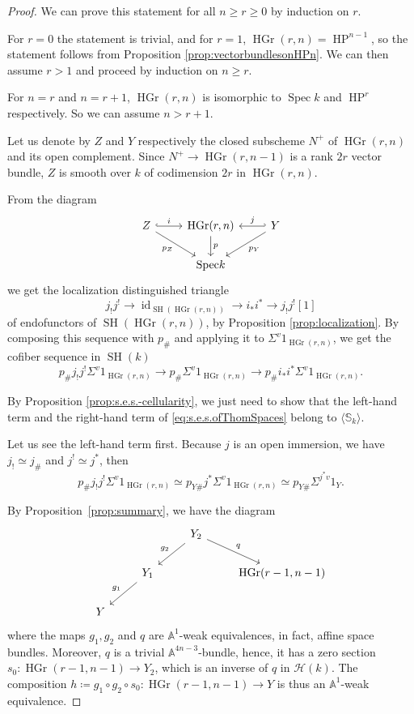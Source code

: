 \documentclass[10pt]{amsart}
\theoremstyle{definition}
\theoremstyle{plain}
\numberwithin{equation}{section}
\newcommand{\0}{\emptyset}
\newcommand{\sH}{{\mathcal H}}
\newcommand{\HGr}{{\operatorname{HGr}}}
\newcommand{\HP}{{\operatorname{HP}}}
\newcommand{\Spec}{{\operatorname{Spec}}}
\newcommand{\SH}{{\operatorname{SH}}}
\newcommand{\id}{{\operatorname{id}}}
\begin{document}
\begin{proof}
 We can prove this statement for all $n \ge r \ge 0$ by induction on $r$.

For $r=0$ the statement is trivial, and for $r=1$, $\HGr(r,n)=\HP^{n-1}$, so the statement follows from Proposition \ref{prop:vectorbundlesonHPn}. We can then assume $r>1$ and proceed by induction on $n \ge r$.

For $n=r$ and $n=r+1$, $\HGr(r,n)$ is isomorphic to $\Spec k$ and $\HP^r$ respectively. So we can assume $n>r+1$.

Let us denote by $Z$ and $Y$ respectively the closed subscheme $N^+$ of $\HGr(r,n)$ and its open complement. Since $N^+\to \HGr(r,n-1)$ is a rank $2r$ vector bundle, $Z$ is smooth over $k$ of codimension $2r$ in $\HGr(r,n)$.

From the diagram
\begin{equation}
\label{diag:loc.sequence.HGr}
    \begin{tikzcd}
    Z \arrow[r, hookrightarrow, "i"] \arrow[dr, "p_Z", swap] & \HGr(r,n) \arrow[d, "p"] & Y \arrow[l, hook', "j", swap] \arrow[dl, "p_Y"] \\
    & \Spec k &
\end{tikzcd}
\end{equation}
we get the localization distinguished triangle
$$j_!j^! \to \id_{\SH(\HGr(r,n))} \to i_*i^* \to j_!j^![1]$$
of endofunctors of $\SH(\HGr(r,n))$, by Proposition \ref{prop:localization}. By composing this sequence with $p_{\#}$ and applying it to $\Sigma^v1_{\HGr(r,n)}$, we get the cofiber sequence in $\SH(k)$
\begin{equation}
    \label{eq:s.e.s.ofThomSpaces}
    p_{\#}j_!j^!\Sigma^v1_{\HGr(r,n)} \to p_{\#}\Sigma^v1_{\HGr(r,n)} \to p_{\#}i_*i^*\Sigma^v1_{\HGr(r,n)}.
\end{equation}
 
By Proposition \ref{prop:s.e.s.-cellularity}, we just need to show that the left-hand term and the right-hand term of \eqref{eq:s.e.s.ofThomSpaces} belong to $\langle \mathbb{S}_k \rangle$.

Let us see the left-hand term first. Because $j$ is an open immersion, we have $j_!\simeq j_\#$ and $j^!\simeq j^*$, then $$p_{\#}j_!j^!\Sigma^v1_{\HGr(r,n)}\simeq p_{Y\#}j^*\Sigma^v1_{\HGr(r,n)} \simeq p_{Y\#}\Sigma^{j^*v}1_Y.$$

By Proposition~\ref{prop:summary}, we have the diagram
$$\begin{tikzcd}
    &&Y_2 \arrow[dl, swap, "g_2"] \arrow[dr, "q"]& \\
    &Y_1 \arrow[dl, swap, "g_1"]&&\HGr(r-1,n-1)\\
    Y &&&
    \end{tikzcd}$$
where the maps $g_1,g_2$ and $q$ are $\mathbb{A}^1$-weak equivalences, in fact, affine space bundles. Moreover, $q$ is a trivial $\mathbb{A}^{4n-3}$-bundle, hence, it has a zero section $s_0:\HGr(r-1,n-1) \to Y_2$, which is an inverse of $q$ in $\sH(k)$. The composition $h \coloneqq g_1 \circ g_2 \circ s_0: \HGr(r-1,n-1) \to Y$ is thus an $\mathbb{A}^1$-weak equivalence.


\end{proof}
\end{document}
